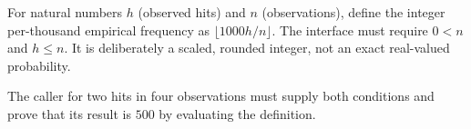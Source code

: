 For natural numbers $h$ (observed hits) and $n$ (observations), define the
integer per-thousand empirical frequency as $\lfloor 1000h/n\rfloor$.
The interface must require $0<n$ and $h\leq n$. It is deliberately a scaled,
rounded integer, not an exact real-valued probability.

The caller for two hits in four observations must supply both conditions
and prove that its result is $500$ by evaluating the definition.
